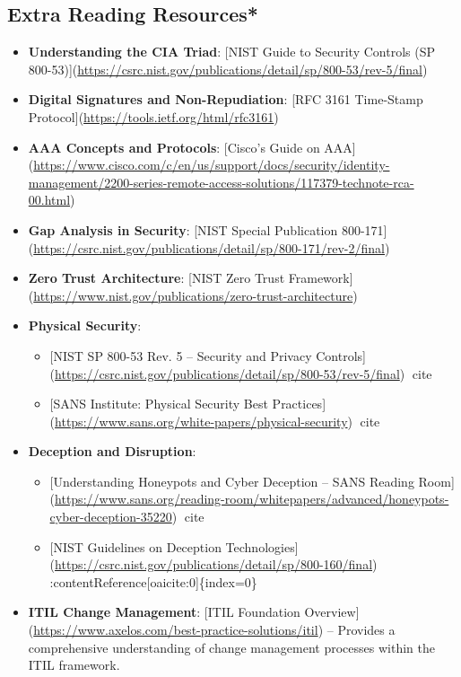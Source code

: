 \documentclass[11pt]{article}
\begin{document}
\subsection{Extra Reading Resources*}
\label{sec:orgd35db94}
\begin{itemize}
\item \textbf{Understanding the CIA Triad}:
{[}NIST Guide to Security Controls (SP 800-53)](\url{https://csrc.nist.gov/publications/detail/sp/800-53/rev-5/final})
\item \textbf{Digital Signatures and Non-Repudiation}:
{[}RFC 3161 Time-Stamp Protocol](\url{https://tools.ietf.org/html/rfc3161})
\item \textbf{AAA Concepts and Protocols}:
{[}Cisco’s Guide on AAA](\url{https://www.cisco.com/c/en/us/support/docs/security/identity-management/2200-series-remote-access-solutions/117379-technote-rca-00.html})
\item \textbf{Gap Analysis in Security}:
{[}NIST Special Publication 800-171](\url{https://csrc.nist.gov/publications/detail/sp/800-171/rev-2/final})
\item \textbf{Zero Trust Architecture}:
{[}NIST Zero Trust Framework](\url{https://www.nist.gov/publications/zero-trust-architecture})
\item \textbf{Physical Security}:
\begin{itemize}
\item {[}NIST SP 800-53 Rev. 5 – Security and Privacy Controls](\url{https://csrc.nist.gov/publications/detail/sp/800-53/rev-5/final}) cite
\item {[}SANS Institute: Physical Security Best Practices](\url{https://www.sans.org/white-papers/physical-security}) cite
\end{itemize}
\item \textbf{Deception and Disruption}:
\begin{itemize}
\item {[}Understanding Honeypots and Cyber Deception – SANS Reading Room](\url{https://www.sans.org/reading-room/whitepapers/advanced/honeypots-cyber-deception-35220}) cite
\item {[}NIST Guidelines on Deception Technologies](\url{https://csrc.nist.gov/publications/detail/sp/800-160/final}) :contentReference[oaicite:0]\{index=0\}
\end{itemize}
\item \textbf{ITIL Change Management}:
{[}ITIL Foundation Overview](\url{https://www.axelos.com/best-practice-solutions/itil}) – Provides a comprehensive understanding of change management processes within the ITIL framework.

\end{itemize}
\end{document}
